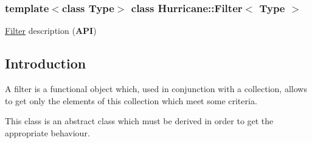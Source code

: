\subsubsection*{template$<$class Type$>$\newline
class Hurricane\+::\+Filter$<$ Type $>$}

\hyperlink{classHurricane_1_1Filter}{Filter} description ({\bfseries A\+PI}) 

\hypertarget{classHurricane_1_1Filter_secFilterIntro}{}\subsection{Introduction}\label{classHurricane_1_1Filter_secFilterIntro}
A filter is a functional object which, used in conjunction with a collection, allows to get only the elements of this collection which meet some criteria.

This class is an abstract class which must be derived in order to get the appropriate behaviour.

